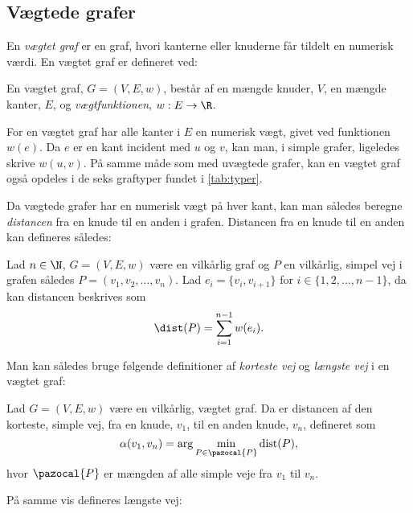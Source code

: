 \subsection{Vægtede grafer} \label{kap:vaegtede}
En \emph{vægtet graf} er en graf, hvori kanterne eller knuderne får tildelt en numerisk værdi. 
En vægtet graf er defineret ved:
\begin{defn}
En vægtet graf, $G=(V,E,w)$, består af en mængde knuder, $V$, en mængde kanter, $E$, og \emph{vægtfunktionen}, $w: E \rightarrow \R$.
\end{defn}

For en vægtet graf har alle kanter i $E$ en numerisk vægt, givet ved funktionen $w(e)$. Da $e$ er en kant incident med $u$ og $v$, kan man, i simple grafer, ligeledes skrive $w(u,v)$. På samme måde som med uvægtede grafer, kan en vægtet graf også opdeles i de seks graftyper fundet i \autoref{tab:typer}.


Da vægtede grafer har en numerisk vægt på hver kant, kan man således beregne \emph{distancen} fra en knude til en anden i grafen. Distancen fra en knude til en anden kan defineres således:

\begin{defn}[Distance]
Lad $n \in \N $, $G=(V,E,w)$ være en vilkårlig graf og $P$ en vilkårlig, simpel vej i grafen således $P=(v_{1},v_{2},\dotsc,v_{n})$. Lad $e_i = \{v_i,v_{i+1}\}$ for $i \in \{ 1, 2, \dotsc, n-1 \}$, da kan distancen beskrives som
	\begin{equation}
	\dist(P)=\sum_{i=1}^{n-1}w(e_i).
	\end{equation}  
\end{defn}

Man kan således bruge følgende definitioner af \emph{korteste vej} og \emph{længste vej} i en vægtet graf:


\begin{defn} \label{defn:min.vej}
Lad $G=(V,E,w)$ være en vilkårlig, vægtet graf. Da er distancen af den korteste, simple vej, fra en knude, $v_1$, til en anden knude, $v_n$, defineret som
	\begin{equation}
		\alpha(v_1,v_n)=\arg \min_{P \in \pazocal{P}}
		\textrm{dist}(P),
	\end{equation}
	hvor $\pazocal{P}$ er mængden af alle simple veje fra $v_1$ til $v_n$.
\end{defn}

På samme vis defineres længste vej:

